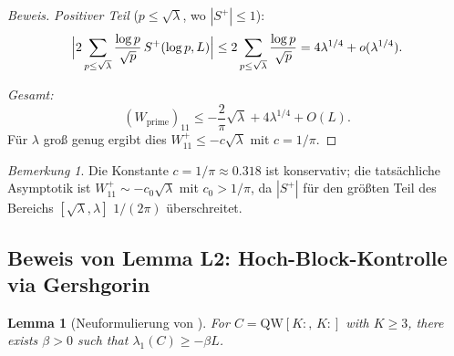 \documentclass[12pt,a4paper]{article}
\newtheorem{lemma}[theorem]{Lemma}
\theoremstyle{definition}
\theoremstyle{remark}
\newtheorem{remark}[theorem]{Bemerkung}
\begin{document}
\begin{proof}[Beweis]
\emph{Positiver Teil} ($p \leq \sqrt{\lambda}$, wo $|S^+| \leq 1$):
\[
  \Bigl|2\sum_{p \leq \sqrt{\lambda}}\frac{\log p}{\sqrt{p}}\,S^+(\log p, L)\Bigr|
  \leq 2\sum_{p \leq \sqrt{\lambda}}\frac{\log p}{\sqrt{p}} = 4\lambda^{1/4} + o(\lambda^{1/4}).
\]

\emph{Gesamt:}
\[
  (W_{\mathrm{prime}})_{11} \leq -\frac{2}{\pi}\sqrt{\lambda} + 4\lambda^{1/4} + O(L).
\]
Für $\lambda$ groß genug ergibt dies $W_{11}^+ \leq -c\sqrt{\lambda}$ mit $c = 1/\pi$.
\end{proof}

\begin{remark}
Die Konstante $c = 1/\pi \approx 0.318$ ist konservativ; die tatsächliche Asymptotik ist $W_{11}^+ \sim -c_0\sqrt{\lambda}$ mit $c_0 > 1/\pi$, da $|S^+|$ für den größten Teil des Bereichs $[\sqrt{\lambda}, \lambda]$ $1/(2\pi)$ überschreitet.
\end{remark}

\subsection{Beweis von Lemma L2: Hoch-Block-Kontrolle via Gershgorin}

\begin{lemma}[Neuformulierung von ]
For $C = \mathrm{QW}[K{:},\,K{:}]$ with $K \geq 3$, there exists $\beta > 0$ such that $\lambda_1(C) \geq -\beta L$.
\end{lemma}
\end{document}
